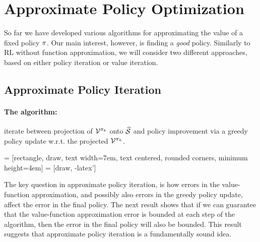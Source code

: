 \section{Approximate Policy Optimization}

So far we have developed various algorithms for approximating the value of a fixed policy $\pi$. Our main interest, however, is finding a \textit{good} policy. Similarly to RL without function approximation, we will consider two different approaches, based on either policy iteration or value iteration.

\subsection{Approximate Policy Iteration}

\paragraph{The algorithm:} iterate between projection of $\mathcal{V}^{\pi_k}$ onto $\widehat{\mathcal{S}}$ and policy improvement via a greedy policy update w.r.t. the projected $\mathcal{V}^{\pi_k}$.

\vspace{20pt}
 = [rectangle, draw,
    text width=7em, text centered, rounded corners, minimum height=4em]
 = [draw, -latex']
\vspace{20pt}

The key question in approximate policy iteration, is how errors in the value-function approximation, and possibly also errors in the greedy policy update, affect the error in the final policy. The next result shows that if we can guarantee that the value-function approximation error is bounded at each step of the algorithm, then the error in the final policy will also be bounded. This result suggests that approximate policy iteration is a fundamentally sound idea.

